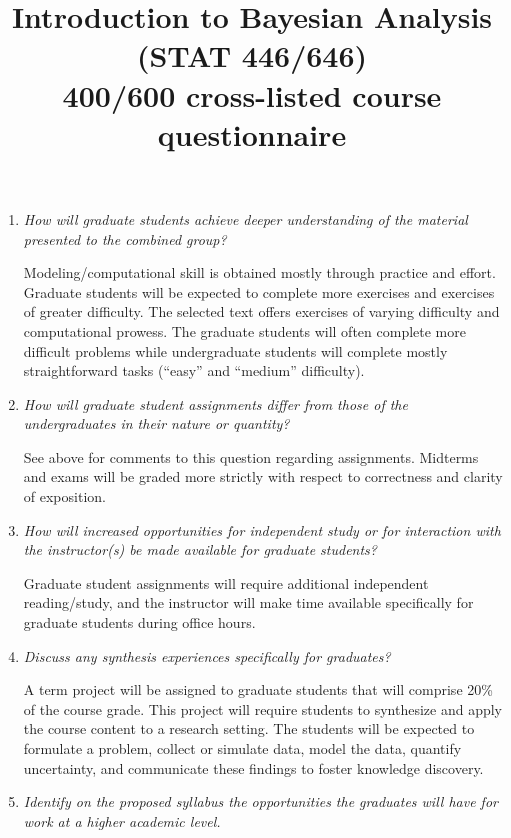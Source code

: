 \documentclass[11pt,onecolumn]{article}
\title{Introduction to Bayesian Analysis (STAT 446/646) \\ 400/600 cross-listed course questionnaire}
\begin{document}
\date{}
\maketitle

\vspace{-0.75in}

\begin{enumerate}
\item \emph{How will graduate students achieve deeper understanding of the material presented to the combined group?}

  Modeling/computational skill is obtained mostly through practice and effort. Graduate students will be expected to complete more exercises and exercises of greater difficulty. The selected text offers exercises of varying difficulty and computational prowess. The graduate students will often complete more difficult problems while undergraduate students will complete mostly straightforward tasks (``easy'' and ``medium'' difficulty).
  
\item \emph{How will graduate student assignments differ from those of the undergraduates in their nature or quantity?}

  See above for comments to this question regarding assignments. Midterms and exams will be graded more strictly with respect to correctness and clarity of exposition.

\item \emph{How will increased opportunities for independent study or for interaction with the instructor(s) be made available for graduate students?}

  Graduate student assignments will require additional independent reading/study, and the instructor will make time available specifically for graduate students during office hours. 
  
\item \emph{Discuss any synthesis experiences specifically for graduates?}

  A term project will be assigned to graduate students that will comprise 20\% of the course grade. This project will require students to synthesize and apply the course content to a research setting. The students will be expected to formulate a problem, collect or simulate data, model the data, quantify uncertainty, and communicate these findings to foster knowledge discovery.

\item \emph{Identify on the proposed syllabus the opportunities the graduates will have for work at a higher academic level.}


\end{enumerate}
\end{document}
